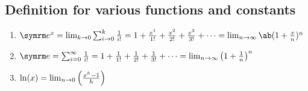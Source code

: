 \subsection{Definition for various functions and constants}

\begin{enumerate}
	\item $\e^x = \lim_{k \appr 0}\sum_{i \appr 0}^{k}\frac{1}{i!} = 1 + \frac{x^1}{1!} + \frac{x^2}{2!} + \frac{x^3}{3!} + \dots = \lim_{n \appr \infty}\ab(1 + \frac{x}{n})^n$
	\item $\e = \sum_{i = 0}^{\infty}\frac{1}{i!} = 1 + \frac{1}{1!} + \frac{1}{2!} + \frac{1}{3!} + \dots = \lim_{n \appr \infty}\left(1 + \frac{1}{n}\right)^n$
    \item $\ln(x) = \lim_{n \rightarrow 0}\left(\frac{x^h - 1}{h}\right)$
\end{enumerate}

\everymath{\textstyle}
